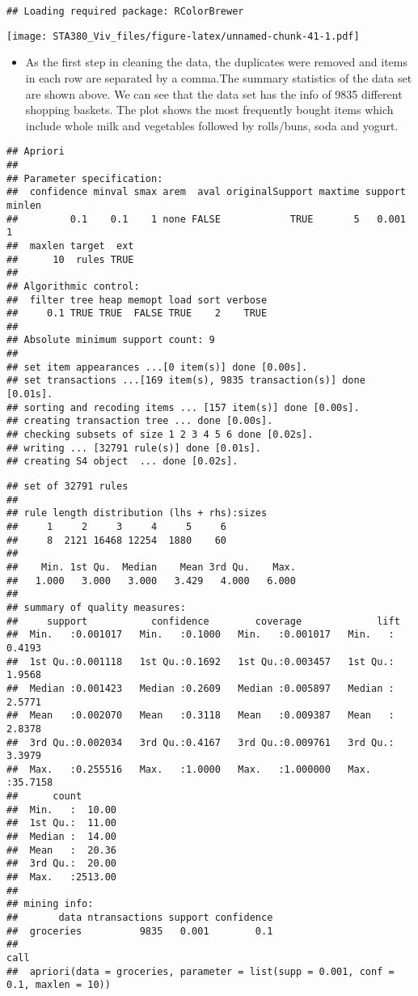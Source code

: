 \documentclass[
  12pt,
]{article}
\providecommand{\tightlist}{%
  \setlength{\itemsep}{0pt}\setlength{\parskip}{0pt}}
\begin{document}
\begin{verbatim}
## Loading required package: RColorBrewer
\end{verbatim}

\texttt{[image: STA380\_Viv\_files/figure-latex/unnamed-chunk-41-1.pdf]}

\begin{itemize}
\tightlist
\item
  As the first step in cleaning the data, the duplicates were removed
  and items in each row are separated by a comma.The summary statistics
  of the data set are shown above. We can see that the data set has the
  info of 9835 different shopping baskets. The plot shows the most
  frequently bought items which include whole milk and vegetables
  followed by rolls/buns, soda and yogurt.
\end{itemize}

\begin{verbatim}
## Apriori
## 
## Parameter specification:
##  confidence minval smax arem  aval originalSupport maxtime support minlen
##         0.1    0.1    1 none FALSE            TRUE       5   0.001      1
##  maxlen target  ext
##      10  rules TRUE
## 
## Algorithmic control:
##  filter tree heap memopt load sort verbose
##     0.1 TRUE TRUE  FALSE TRUE    2    TRUE
## 
## Absolute minimum support count: 9 
## 
## set item appearances ...[0 item(s)] done [0.00s].
## set transactions ...[169 item(s), 9835 transaction(s)] done [0.01s].
## sorting and recoding items ... [157 item(s)] done [0.00s].
## creating transaction tree ... done [0.00s].
## checking subsets of size 1 2 3 4 5 6 done [0.02s].
## writing ... [32791 rule(s)] done [0.01s].
## creating S4 object  ... done [0.02s].
\end{verbatim}

\begin{verbatim}
## set of 32791 rules
## 
## rule length distribution (lhs + rhs):sizes
##     1     2     3     4     5     6 
##     8  2121 16468 12254  1880    60 
## 
##    Min. 1st Qu.  Median    Mean 3rd Qu.    Max. 
##   1.000   3.000   3.000   3.429   4.000   6.000 
## 
## summary of quality measures:
##     support           confidence        coverage             lift        
##  Min.   :0.001017   Min.   :0.1000   Min.   :0.001017   Min.   : 0.4193  
##  1st Qu.:0.001118   1st Qu.:0.1692   1st Qu.:0.003457   1st Qu.: 1.9568  
##  Median :0.001423   Median :0.2609   Median :0.005897   Median : 2.5771  
##  Mean   :0.002070   Mean   :0.3118   Mean   :0.009387   Mean   : 2.8378  
##  3rd Qu.:0.002034   3rd Qu.:0.4167   3rd Qu.:0.009761   3rd Qu.: 3.3979  
##  Max.   :0.255516   Max.   :1.0000   Max.   :1.000000   Max.   :35.7158  
##      count        
##  Min.   :  10.00  
##  1st Qu.:  11.00  
##  Median :  14.00  
##  Mean   :  20.36  
##  3rd Qu.:  20.00  
##  Max.   :2513.00  
## 
## mining info:
##       data ntransactions support confidence
##  groceries          9835   0.001        0.1
##                                                                                call
##  apriori(data = groceries, parameter = list(supp = 0.001, conf = 0.1, maxlen = 10))
\end{verbatim}
\end{document}
